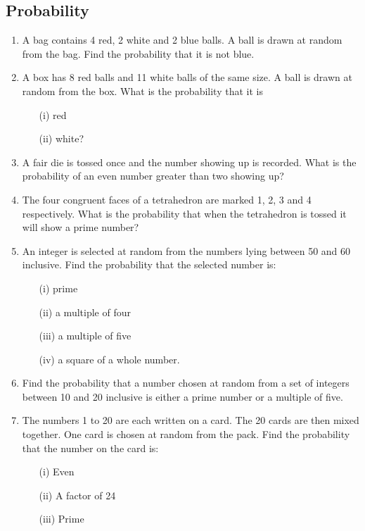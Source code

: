 	\subsection{Probability}
\begin{enumerate}

	\item A bag contains 4 red, 2 white and 2 blue balls. A ball is drawn at random from the bag. Find the probability that it is not blue.
	
	\item A box has 8 red balls and 11 white balls of the same size. A ball is drawn at random from the box. What is the probability that it is
	\begin{itemize}
	\item[(i)] red
	\item[(ii)] white?
	\end{itemize}
	
	\item A fair die is tossed once and the number showing up is recorded. What is the probability of an even number greater than two showing up?
	
	\item The four congruent faces of a tetrahedron are marked 1, 2, 3 and 4 respectively. What is the probability that when the tetrahedron is tossed it will show a prime number?
	
	\item An integer is selected at random from the numbers lying between 50 and 60 inclusive. Find the probability that the selected number is:
		\begin{itemize}
		\item[(i)] prime
		\item[(ii)] a multiple of four
		\item[(iii)] a multiple of five
		\item[(iv)] a square of a whole number.
		\end{itemize}
		
		\item Find the probability that a number chosen at random from a set of integers between 10 and 20 inclusive is either a prime number or a multiple of five.
		
		\item The numbers 1 to 20 are each written on a card. The 20 cards are then mixed together. One card is chosen at random from the pack. Find the probability that the number on the card is:
	\begin{itemize}
	\item[(i)] Even
	\item[(ii)] A factor of 24
	\item[(iii)] Prime
	\end{itemize}
	

\end{enumerate}
